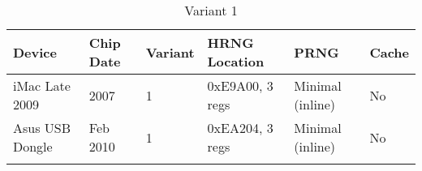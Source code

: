 \documentclass{article}
\begin{document}
\begin{table}[htb]
			\caption{Variant 1}	
	\begin{tabular}{llllll}
		\hline
		\multicolumn{1}{|l|}{\textbf{Device}}   & \multicolumn{1}{l|}{\textbf{Chip Date}} & \multicolumn{1}{l|}{\textbf{Variant}} & \multicolumn{1}{l|}{\textbf{HRNG Location}} & \multicolumn{1}{l|}{\textbf{PRNG}}      & \multicolumn{1}{l|}{\textbf{Cache}} \\ \hline
		\multicolumn{1}{|l|}{iMac Late   2009}  & \multicolumn{1}{l|}{2007}               & \multicolumn{1}{l|}{1}                & \multicolumn{1}{l|}{0xE9A00, 3   regs}      & \multicolumn{1}{l|}{Minimal   (inline)} & \multicolumn{1}{l|}{No}             \\ \hline
		\multicolumn{1}{|l|}{Asus USB   Dongle} & \multicolumn{1}{l|}{Feb 2010}           & \multicolumn{1}{l|}{1}                & \multicolumn{1}{l|}{0xEA204, 3   regs}      & \multicolumn{1}{l|}{Minimal   (inline)} & \multicolumn{1}{l|}{No}             \\ \hline
		&                                         &                                       &                                             &                                         &                                    
	\end{tabular}
\end{table}
\end{document}
